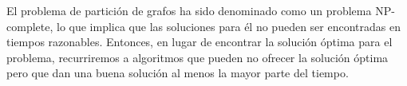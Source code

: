 El problema de partición de grafos ha sido denominado como un problema NP-complete\cite{NPCompleteness}, lo que implica que las soluciones para él no pueden ser encontradas en tiempos razonables. Entonces, en lugar de encontrar la solución óptima para el problema, recurriremos a algoritmos que pueden no ofrecer la solución óptima pero que dan una buena solución al menos la mayor parte del tiempo.

